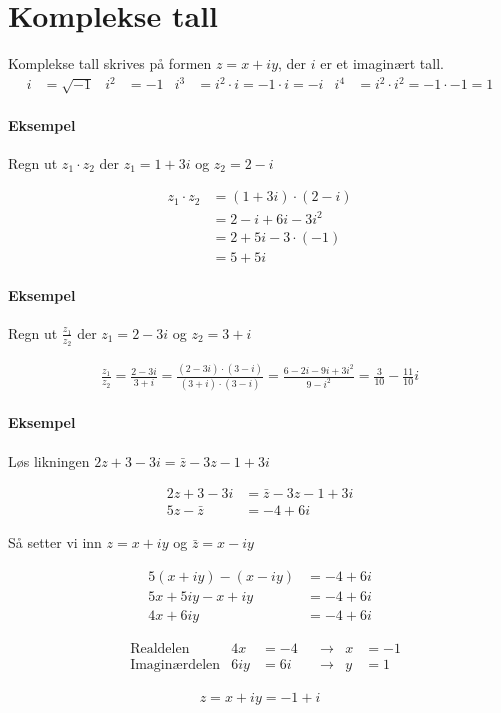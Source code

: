 \documentclass[12pt,norsk,a4paper]{article}
\begin{document}
\newpage
\section{Komplekse tall}
Komplekse tall skrives på formen $z = x + iy$, der $i$ er et imaginært tall.
\begin{align*}
i &= \sqrt{-1}	&	i^2 &= -1	&	i^3 &= i^2 \cdot i = -1 \cdot i = -i	&	i^4 &= i^2 \cdot i^2 = -1 \cdot -1 = 1
\end{align*}

\paragraph*{Eksempel}
Regn ut $z_{1} \cdot z_{2}$ der $z_{1} = 1 + 3i$ og $z_{2} = 2 - i$

\begin{align*}
z_{1} \cdot z_{2} &= (1 + 3i) \cdot (2 - i)	\\
&= 2 - i + 6i - 3i^2	\\
&= 2 + 5i -3 \cdot (-1)	\\
&= 5 + 5i
\end{align*}

\paragraph*{Eksempel}
Regn ut $\frac{z_{1}}{z_{2}}$ der $z_{1} = 2-3i$ og $z_{2} = 3+i$

\begin{align*}
\frac{z_{1}}{z_{2}}	=	\frac{2 - 3i}{3 + i}	=	\frac{(2 - 3i) \cdot (3 - i)}{(3 + i) \cdot (3-i)}	=	\frac{6 - 2i - 9i + 3i^2}{9 - i^2}	=	\frac{3}{10} - \frac{11}{10}i
\end{align*}

\paragraph*{Eksempel}
Løs likningen $2z + 3 -3i = \bar{z} - 3z - 1 + 3i$

\begin{align*}
2z + 3 -3i &= \bar{z} - 3z - 1 + 3i	\\
5z - \bar{z} &= -4 + 6i
\end{align*}

Så setter vi inn $z = x + iy$ og $\bar{z} = x - iy$

\begin{align*}
5(x + iy) - (x -iy) &= -4 + 6i	\\
5x + 5iy - x + iy &= -4 + 6i	\\
4x + 6iy &= -4 + 6i
\end{align*}

\begin{align*}
&	\text{Realdelen}		&	4x &= -4	&	&\rightarrow	&	x &= -1	\\
&	\text{Imaginærdelen}	&	6iy &= 6i	&	&\rightarrow	&	y &= 1
\end{align*}

\begin{align*}
z = x + iy = -1 + i
\end{align*}
\end{document}
